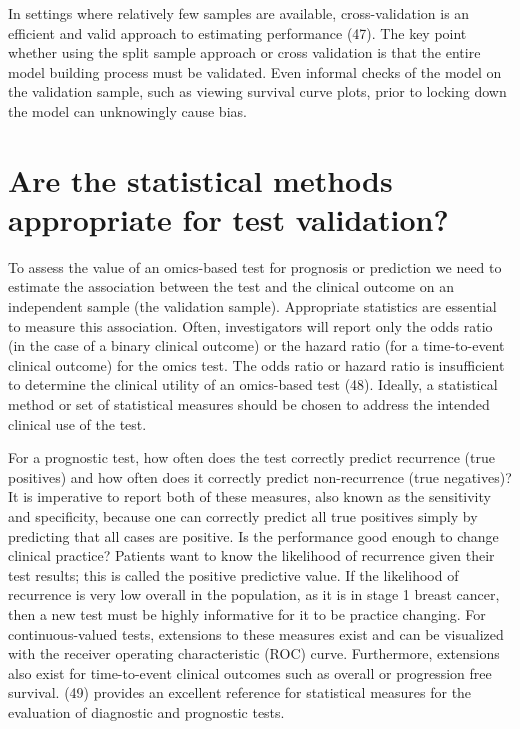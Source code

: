 \documentclass[11pt]{article}
\begin{document}
In settings where relatively few samples are available, cross-validation
is an efficient and valid approach to estimating performance (47). The
key point whether using the split sample approach or cross validation is
that the entire model building process must be validated. Even informal
checks of the model on the validation sample, such as viewing survival
curve plots, prior to locking down the model can unknowingly cause bias.

\section{Are the statistical methods appropriate for test
validation?}\label{are-the-statistical-methods-appropriate-for-test-validation}

To assess the value of an omics-based test for prognosis or prediction
we need to estimate the association between the test and the clinical
outcome on an independent sample (the validation sample). Appropriate
statistics are essential to measure this association. Often,
investigators will report only the odds ratio (in the case of a binary
clinical outcome) or the hazard ratio (for a time-to-event clinical
outcome) for the omics test. The odds ratio or hazard ratio is
insufficient to determine the clinical utility of an omics-based test
(48). Ideally, a statistical method or set of statistical measures
should be chosen to address the intended clinical use of the test.

For a prognostic test, how often does the test correctly predict
recurrence (true positives) and how often does it correctly predict
non-recurrence (true negatives)? It is imperative to report both of
these measures, also known as the sensitivity and specificity, because
one can correctly predict all true positives simply by predicting that
all cases are positive. Is the performance good enough to change
clinical practice? Patients want to know the likelihood of recurrence
given their test results; this is called the positive predictive value.
If the likelihood of recurrence is very low overall in the population,
as it is in stage 1 breast cancer, then a new test must be highly
informative for it to be practice changing. For continuous-valued tests,
extensions to these measures exist and can be visualized with the
receiver operating characteristic (ROC) curve. Furthermore, extensions
also exist for time-to-event clinical outcomes such as overall or
progression free survival. (49) provides an excellent reference for
statistical measures for the evaluation of diagnostic and prognostic
tests.
\end{document}
